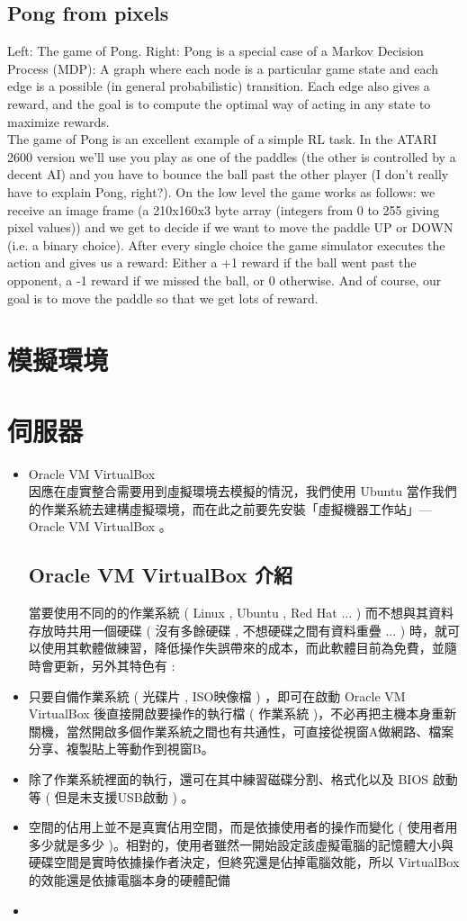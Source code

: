 \documentclass[14pt,a4paper]{report}  %
\begin{document}
\section{Pong from pixels}
\qquad Left: The game of Pong. Right: Pong is a special case of a Markov Decision Process (MDP): A graph where each node is a particular game state and each edge is a possible (in general probabilistic) transition. Each edge also gives a reward, and the goal is to compute the optimal way of acting in any state to maximize rewards.\\ 
The game of Pong is an excellent example of a simple RL task. In the ATARI 2600 version we’ll use you play as one of the paddles (the other is controlled by a decent AI) and you have to bounce the ball past the other player (I don’t really have to explain Pong, right?). On the low level the game works as follows: we receive an image frame (a 210x160x3 byte array (integers from 0 to 255 giving pixel values)) and we get to decide if we want to move the paddle UP or DOWN (i.e. a binary choice). After every single choice the game simulator executes the action and gives us a reward: Either a +1 reward if the ball went past the opponent, a -1 reward if we missed the ball, or 0 otherwise. And of course, our goal is to move the paddle so that we get lots of reward.\\

\newpage
\chapter{模擬環境}
\newpage
\chapter{伺服器}
\begin{itemize}
\item Oracle VM VirtualBox\\
\qquad 因應在虛實整合需要用到虛擬環境去模擬的情況，我們使用 Ubuntu 當作我們的作業系統去建構虛擬環境，而在此之前要先安裝「虛擬機器工作站」— Oracle VM VirtualBox 。
\section{Oracle VM VirtualBox 介紹}
當要使用不同的的作業系統 ( Linux , Ubuntu , Red Hat ...  ) 而不想與其資料存放時共用一個硬碟 ( 沒有多餘硬碟 , 不想硬碟之間有資料重疊 ... ) 時，就可以使用其軟體做練習，降低操作失誤帶來的成本，而此軟體目前為免費，並隨時會更新，另外其特色有 :
\item 只要自備作業系統 ( 光碟片 , ISO映像檔 ) ，即可在啟動 Oracle VM VirtualBox  後直接開啟要操作的執行檔 ( 作業系統 )，不必再把主機本身重新關機，當然開啟多個作業系統之間也有共通性，可直接從視窗A做網路、檔案分享、複製貼上等動作到視窗B。
\item 除了作業系統裡面的執行，還可在其中練習磁碟分割、格式化以及 BIOS 啟動等 ( 但是未支援USB啟動 ) 。
\item 空間的佔用上並不是真實佔用空間，而是依據使用者的操作而變化 ( 使用者用多少就是多少 )。相對的，使用者雖然一開始設定該虛擬電腦的記憶體大小與硬碟空間是實時依據操作者決定，但終究還是佔掉電腦效能，所以 VirtualBox 的效能還是依據電腦本身的硬體配備
\item
\end{itemize}
\newpage
\end{document}
